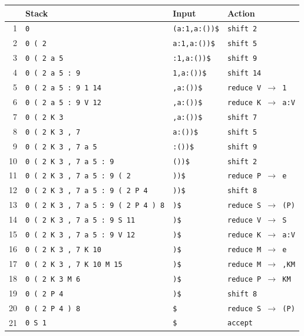 \documentclass[11pt]{article}
\begin{document}
{\small
\begin{longtable}{rlll}
\toprule
& Stack & Input & Action \\
\midrule
1 & \texttt{0} & \texttt{(a:1,{}a:())\$} & \texttt{shift 2} \\
2 & \texttt{0 ( 2} & \texttt{a:1,{}a:())\$} & \texttt{shift 5} \\
3 & \texttt{0 ( 2 a 5} & \texttt{:1,{}a:())\$} & \texttt{shift 9} \\
4 & \texttt{0 ( 2 a 5 : 9} & \texttt{1,{}a:())\$} & \texttt{shift 14} \\
5 & \texttt{0 ( 2 a 5 : 9 1 14} & \texttt{,{}a:())\$} & \texttt{reduce V $\to$ 1} \\
6 & \texttt{0 ( 2 a 5 : 9 V 12} & \texttt{,{}a:())\$} & \texttt{reduce K $\to$ a:V} \\
7 & \texttt{0 ( 2 K 3} & \texttt{,{}a:())\$} & \texttt{shift 7} \\
8 & \texttt{0 ( 2 K 3 ,{} 7} & \texttt{a:())\$} & \texttt{shift 5} \\
9 & \texttt{0 ( 2 K 3 ,{} 7 a 5} & \texttt{:())\$} & \texttt{shift 9} \\
10 & \texttt{0 ( 2 K 3 ,{} 7 a 5 : 9} & \texttt{())\$} & \texttt{shift 2} \\
11 & \texttt{0 ( 2 K 3 ,{} 7 a 5 : 9 ( 2} & \texttt{))\$} & \texttt{reduce P $\to$ e} \\
12 & \texttt{0 ( 2 K 3 ,{} 7 a 5 : 9 ( 2 P 4} & \texttt{))\$} & \texttt{shift 8} \\
13 & \texttt{0 ( 2 K 3 ,{} 7 a 5 : 9 ( 2 P 4 ) 8} & \texttt{)\$} & \texttt{reduce S $\to$ (P)} \\
14 & \texttt{0 ( 2 K 3 ,{} 7 a 5 : 9 S 11} & \texttt{)\$} & \texttt{reduce V $\to$ S} \\
15 & \texttt{0 ( 2 K 3 ,{} 7 a 5 : 9 V 12} & \texttt{)\$} & \texttt{reduce K $\to$ a:V} \\
16 & \texttt{0 ( 2 K 3 ,{} 7 K 10} & \texttt{)\$} & \texttt{reduce M $\to$ e} \\
17 & \texttt{0 ( 2 K 3 ,{} 7 K 10 M 15} & \texttt{)\$} & \texttt{reduce M $\to$ ,{}KM} \\
18 & \texttt{0 ( 2 K 3 M 6} & \texttt{)\$} & \texttt{reduce P $\to$ KM} \\
19 & \texttt{0 ( 2 P 4} & \texttt{)\$} & \texttt{shift 8} \\
20 & \texttt{0 ( 2 P 4 ) 8} & \texttt{\$} & \texttt{reduce S $\to$ (P)} \\
21 & \texttt{0 S 1} & \texttt{\$} & \texttt{accept} \\
\bottomrule
\end{longtable}}
\end{document}
